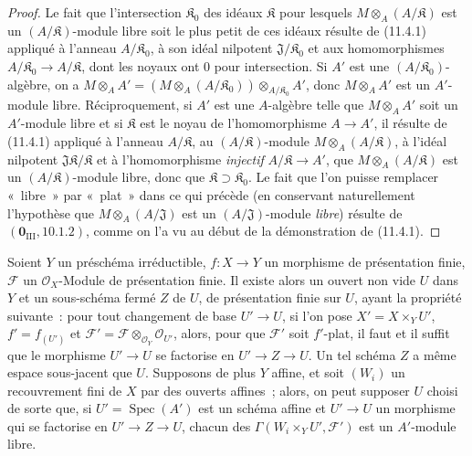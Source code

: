 \begin{proof}
Le fait que l'intersection $\mathfrak K_0$ des idéaux $\mathfrak K$ pour
lesquels $M\otimes_A(A/\mathfrak K)$ est un $(A/\mathfrak K)$-module libre
soit le plus petit de ces idéaux résulte de (11.4.1) appliqué à l'anneau
$A/\mathfrak K_0$, à son idéal nilpotent $\mathfrak J/\mathfrak K_0$ et aux
homomorphismes $A/\mathfrak K_0\to A/\mathfrak K$, dont les noyaux ont $0$
pour intersection. Si $A'$ est une $(A/\mathfrak K_0)$-algèbre, on a
$M\otimes_A A'=
(M\otimes_A(A/\mathfrak K_0))\otimes_{A/\mathfrak K_0}A'$,
donc $M\otimes_A A'$ est un $A'$-module libre. Réciproquement, si $A'$ est
une $A$-algèbre telle que $M\otimes_A A'$ soit un $A'$-module libre et si
$\mathfrak K$ est le noyau de l'homomorphisme $A\to A'$, il résulte de
(11.4.1) appliqué à l'anneau $A/\mathfrak K$, au
$(A/\mathfrak K)$-module $M\otimes_A(A/\mathfrak K)$, à l'idéal nilpotent
$\mathfrak J\mathfrak K/\mathfrak K$ et à l'homomorphisme \emph{injectif}
$A/\mathfrak K\to A'$, que $M\otimes_A(A/\mathfrak K)$ est un
$(A/\mathfrak K)$-module libre, donc que $\mathfrak K\supset\mathfrak K_0$.
Le fait que l'on puisse remplacer «~libre~» par «~plat~» dans ce qui précède
(en conservant naturellement l'hypothèse que $M\otimes_A(A/\mathfrak J)$ est
un $(A/\mathfrak J)$-module \emph{libre}) résulte de
$(\mathbf 0_{\mathrm{III}},10.1.2)$, comme on l'a vu au début de la
démonstration de (11.4.1).
\end{proof}

\begin{proposition}[11.4.5]
\label{IV.11.4.5-fr}
Soient $Y$ un préschéma irréductible, $f:X\to Y$ un morphisme de présentation
finie, $\mathcal F$ un $\mathcal O_X$-Module de présentation finie. Il existe
alors un ouvert non vide $U$ dans $Y$ et un sous-schéma fermé $Z$ de $U$, de
présentation finie sur $U$, ayant la propriété suivante~: pour tout changement
de base $U'\to U$, si l'on pose $X'=X\times_YU'$, $f'=f_{(U')}$ et
$\mathcal F'=\mathcal F\otimes_{\mathcal O_Y}\mathcal O_{U'}$, alors, pour que
$\mathcal F'$ soit $f'$-plat, il faut et il suffit que le morphisme $U'\to U$
se factorise en $U'\to Z\to U$. Un tel schéma $Z$ a même espace sous-jacent que
$U$. Supposons de plus $Y$ affine, et soit $(W_i)$ un recouvrement fini de $X$
par des ouverts affines~; alors, on peut supposer $U$ choisi de sorte que, si
$U'=\operatorname{Spec}(A')$ est un schéma affine et $U'\to U$ un morphisme qui
se factorise en $U'\to Z\to U$, chacun des
$\Gamma(W_i\times_YU',\mathcal F')$ est un $A'$-module libre.
\end{proposition}

